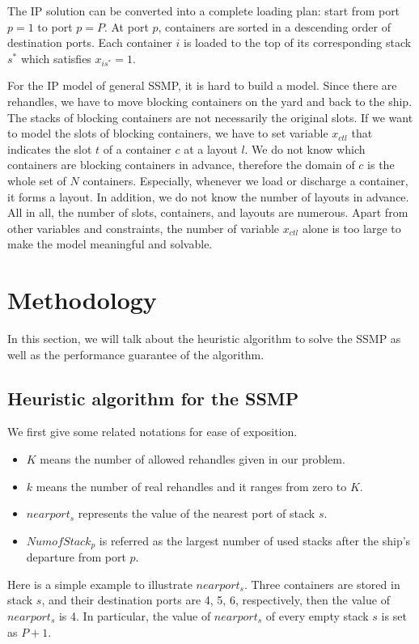 \documentclass[review,3p,times,authoryear,12pt]{elsarticle}
\begin{document}
The IP solution can be converted into a complete loading plan: start from port $p=1$ to port $p=P$. At port $p$, containers are sorted in a descending order of destination ports. Each container $i$ is loaded to the top of its corresponding stack $s^*$ which satisfies $x_{is^*}=1$.

For the IP model of general SSMP, it is hard to build a model.
Since there are rehandles, we have to move blocking containers on the yard and back to the ship.
The stacks of blocking containers are not necessarily the original slots.
If we want to model the slots of blocking containers, we have to set variable $x_{ctl}$ that indicates the slot $t$ of a container $c$ at a layout $l$.
We do not know which containers are blocking containers in advance, therefore the domain of $c$ is the whole set of $N$ containers.
Especially, whenever we load or discharge a container, it forms a layout.
In addition, we do not know the number of layouts in advance.
All in all, the number of slots, containers, and layouts are numerous. Apart from other variables and constraints, the number of variable $x_{ctl}$ alone is too large to make the model meaningful and solvable.

\section{Methodology}
\label{sec:algo}
In this section, we will talk about the heuristic algorithm to solve the SSMP as well as the performance guarantee of the algorithm.

\subsection{Heuristic algorithm for the SSMP}
\label{sec:h1}
We first give some related notations for ease of exposition.

\begin{itemize}
\item $K$ means the number of allowed rehandles given in our problem.
\item $k$ means the number of real rehandles and it ranges from zero to $K$.
\item $nearport_s$ represents the value of the nearest port of stack $s$.
\item $NumofStack_p$ is referred as the largest number of used stacks after the ship's departure from port $p$.
\end{itemize}

Here is a simple example to illustrate $nearport_s$. Three containers are stored in stack $s$, and their destination ports are 4, 5, 6, respectively, then the value of $nearport_s$ is 4.
In particular, the value of $nearport_s$ of every empty stack $s$ is set as $P+1$.
\end{document}
